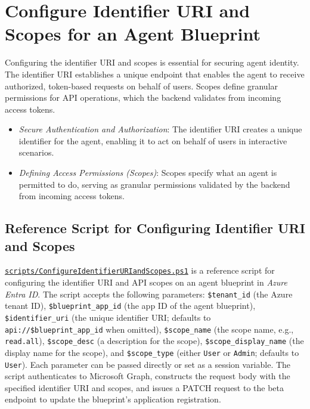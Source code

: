 \documentclass[9pt]{extarticle}%
\begin{document}
\section{Configure Identifier URI and Scopes for an Agent Blueprint}%
Configuring the identifier URI and scopes is essential for securing agent identity. The identifier URI establishes a unique endpoint that enables the agent to receive authorized, token-based requests on behalf of users. Scopes define granular permissions for API operations, which the backend validates from incoming access tokens.
%
\par\vspace{\baselineskip}%
\begin{itemize}[topsep=0pt]%
\item \textit{Secure Authentication and Authorization}: The identifier URI creates a unique identifier for the agent, enabling it to act on behalf of users in interactive scenarios.%
\item \textit{Defining Access Permissions (Scopes)}: Scopes specify what an agent is permitted to do, serving as granular permissions validated by the backend from incoming access tokens.%
\end{itemize}%
\vspace{\baselineskip}%
\subsection{Reference Script for Configuring Identifier URI and Scopes}%
\href{https://github.com/dennisseah/agent-identity/blob/main/scripts/ConfigureIdentifierURIandScopes.ps1}{\texttt{scripts/ConfigureIdentifierURIandScopes.ps1}} is a reference script for configuring the identifier URI and API scopes on an agent blueprint in \textit{Azure Entra ID}. The script accepts the following parameters: \texttt{\$tenant\_id} (the Azure tenant ID), \texttt{\$blueprint\_app\_id} (the app ID of the agent blueprint), \texttt{\$identifier\_uri} (the unique identifier URI; defaults to \texttt{api://\$blueprint\_app\_id} when omitted), \texttt{\$scope\_name} (the scope name, e.g., \texttt{read.all}), \texttt{\$scope\_desc} (a description for the scope), \texttt{\$scope\_display\_name} (the display name for the scope), and \texttt{\$scope\_type} (either \texttt{User} or \texttt{Admin}; defaults to \texttt{User}). Each parameter can be passed directly or set as a session variable. The script authenticates to Microsoft Graph, constructs the request body with the specified identifier URI and scopes, and issues a PATCH request to the beta endpoint to update the blueprint's application registration.
%
\par\vspace{\baselineskip}%
\end{document}
